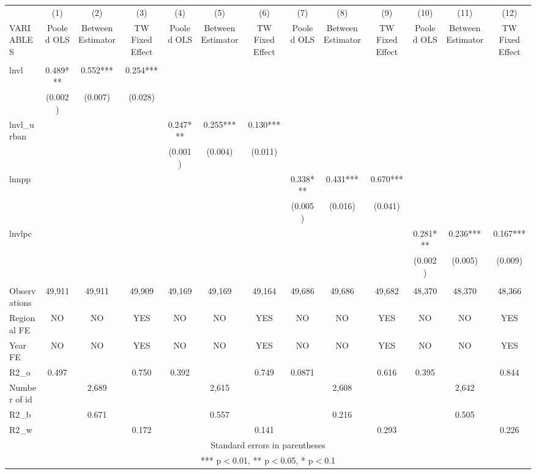 \documentclass[]{article}
\begin{document}
\begin{tabular}{lcccccccccccc} \hline
 & (1) & (2) & (3) & (4) & (5) & (6) & (7) & (8) & (9) & (10) & (11) & (12) \\
VARIABLES & Pooled OLS & Between Estimator & TW Fixed Effect & Pooled OLS & Between Estimator & TW Fixed Effect & Pooled OLS & Between Estimator & TW Fixed Effect & Pooled OLS & Between Estimator & TW Fixed Effect \\ \hline
 &  &  &  &  &  &  &  &  &  &  &  &  \\
lnvl & 0.489*** & 0.552*** & 0.254*** &  &  &  &  &  &  &  &  &  \\
 & (0.002) & (0.007) & (0.028) &  &  &  &  &  &  &  &  &  \\
lnvl\_urban &  &  &  & 0.247*** & 0.255*** & 0.130*** &  &  &  &  &  &  \\
 &  &  &  & (0.001) & (0.004) & (0.011) &  &  &  &  &  &  \\
lnnpp &  &  &  &  &  &  & 0.338*** & 0.431*** & 0.670*** &  &  &  \\
 &  &  &  &  &  &  & (0.005) & (0.016) & (0.041) &  &  &  \\
lnvlpc &  &  &  &  &  &  &  &  &  & 0.281*** & 0.236*** & 0.167*** \\
 &  &  &  &  &  &  &  &  &  & (0.002) & (0.005) & (0.009) \\
 &  &  &  &  &  &  &  &  &  &  &  &  \\
Observations & 49,911 & 49,911 & 49,909 & 49,169 & 49,169 & 49,164 & 49,686 & 49,686 & 49,682 & 48,370 & 48,370 & 48,366 \\
Regional FE & NO & NO & YES & NO & NO & YES & NO & NO & YES & NO & NO & YES \\
Year FE & NO & NO & YES & NO & NO & YES & NO & NO & YES & NO & NO & YES \\
R2\_o & 0.497 &  & 0.750 & 0.392 &  & 0.749 & 0.0871 &  & 0.616 & 0.395 &  & 0.844 \\
Number of id &  & 2,689 &  &  & 2,615 &  &  & 2,608 &  &  & 2,642 &  \\
R2\_b &  & 0.671 &  &  & 0.557 &  &  & 0.216 &  &  & 0.505 &  \\
 R2\_w &  &  & 0.172 &  &  & 0.141 &  &  & 0.293 &  &  & 0.226 \\ \hline
\multicolumn{13}{c}{ Standard errors in parentheses} \\
\multicolumn{13}{c}{ *** p$<$0.01, ** p$<$0.05, * p$<$0.1} \\
\end{tabular}
\end{document}
